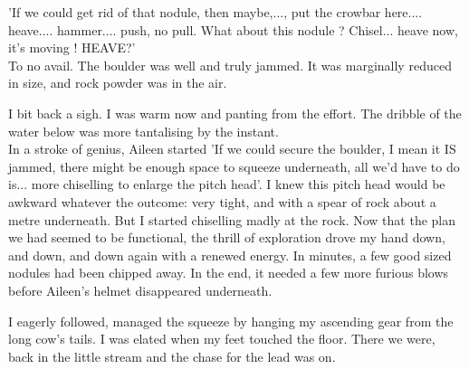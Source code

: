 'If we could get rid of that nodule, then maybe,..., put the crowbar here.... heave.... hammer.... push, no pull. What about this nodule ? Chisel... heave now, it's moving ! HEAVE?'\\ 
To no avail. The boulder was well and truly jammed. It was marginally reduced in size, and rock powder was in the air.

I bit back a sigh. I was warm now and panting from the effort. The dribble of the water below was more tantalising by the instant. \\
In a stroke of genius, Aileen started 'If we could secure the boulder, I mean it IS jammed, there might be enough space to squeeze underneath, all we'd have to do is... more chiselling to enlarge the pitch head'.
I knew this pitch head would be awkward whatever the outcome: very tight, and with a spear of rock about a metre underneath. But I started chiselling madly at the rock. Now that the plan we had seemed to be functional, the thrill of exploration drove my hand down, and down, and down again with a renewed energy. In minutes, a few good sized nodules had been chipped away. In the end, it needed a few more furious blows before Aileen's helmet disappeared underneath.

I eagerly followed, managed the squeeze by hanging my ascending gear from the long cow's tails. I was elated when my feet touched the floor. There we were, back in the little stream and the chase for the lead was on.


